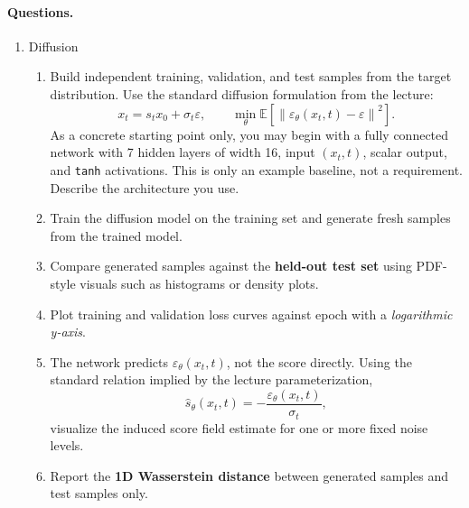 \documentclass[11pt]{article}
\begin{document}
\paragraph{Questions.}
\begin{enumerate}
  \item Diffusion
  \begin{enumerate}
    \item Build independent training, validation, and test samples from the target distribution. Use the standard diffusion formulation from the lecture:
    \[
      x_t = s_t x_0 + \sigma_t \varepsilon,
      \qquad
      \min_\theta \mathbb{E}\left[\left\lVert \varepsilon_\theta(x_t,t)-\varepsilon \right\rVert^2\right].
    \]
    As a concrete starting point only, you may begin with a fully connected network with 7 hidden layers of width 16, input $(x_t,t)$, scalar output, and \texttt{tanh} activations. This is only an example baseline, not a requirement. Describe the architecture you use.
    \item Train the diffusion model on the training set and generate fresh samples from the trained model.
    \item Compare generated samples against the \textbf{held-out test set} using PDF-style visuals such as histograms or density plots.
    \item Plot training and validation loss curves against epoch with a \emph{logarithmic y-axis}.
    \item The network predicts $\varepsilon_\theta(x_t,t)$, not the score directly. Using the standard relation implied by the lecture parameterization,
    \[
      \hat{s}_\theta(x_t,t) = -\frac{\varepsilon_\theta(x_t,t)}{\sigma_t},
    \]
    visualize the induced score field estimate for one or more fixed noise levels.
    \item Report the \textbf{1D Wasserstein distance} between generated samples and test samples only.
  \end{enumerate}


\end{enumerate}
\end{document}
